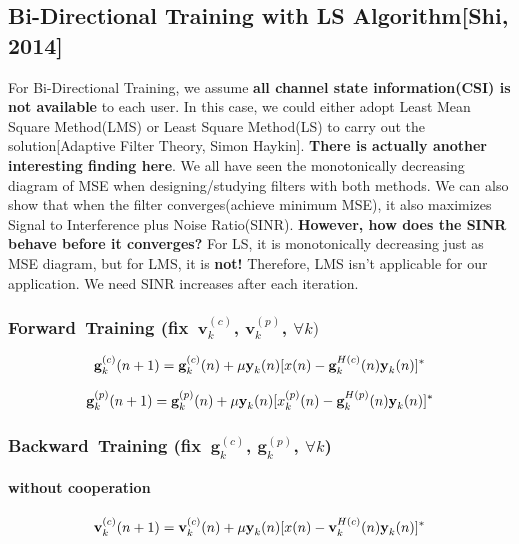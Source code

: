 \documentclass[11pt, oneside]{article}   	%
\begin{document}
\subsection{Bi-Directional Training with LS Algorithm[Shi, 2014]}
For Bi-Directional Training, we assume \textbf{all channel state information(CSI) is not available} to each user. In this case, we could either adopt Least Mean Square Method(LMS) or Least Square Method(LS) to carry out the solution[Adaptive Filter Theory, Simon Haykin]. \textbf{There is actually another interesting finding here}. We all have seen the monotonically decreasing diagram of MSE when designing/studying filters with both methods. We can also show that when the filter converges(achieve minimum MSE), it also maximizes Signal to Interference plus Noise Ratio(SINR). \textbf{However, how does the SINR behave before it converges?} For LS, it is monotonically  decreasing just as MSE diagram, but for LMS, it is \textbf{not!} Therefore, LMS isn't applicable for our application. We need SINR increases after each iteration.


\subsubsection{Forward\ Training (fix\  $\textbf{v}^{(c)}_{k}$, $\textbf{v}^{(p)}_{k}$, $\forall k)$}


\begin{align*}
\textbf{g}^{(c)}_{k}(n+1)= \textbf{g}^{(c)}_{k}(n)+ \mu \textbf y_k(n) [x(n)- \textbf{g}^{H(c)}_{k}(n) \textbf y_k(n)]^*
\end{align*}

\begin{align*}
\textbf{g}^{(p)}_{k}(n+1)= \textbf{g}^{(p)}_{k}(n)+ \mu \textbf y_k(n) [x_k^{(p)}(n)- \textbf{g}^{H(p)}_{k}(n) \textbf y_k(n)]^*
\end{align*}


\subsubsection{Backward\ Training (fix\  $\textbf{g}^{(c)}_{k}$, $\textbf{g}^{(p)}_{k}$, $\forall k$)}
\paragraph{without cooperation}


\begin{align*}
\textbf{v}^{(c)}_{k}(n+1)= \textbf{v}^{(c)}_{k}(n)+ \mu \textbf y_k(n) [x(n)- \textbf{v}^{H(c)}_{k}(n) \textbf y_k(n)]^*
\end{align*}
\end{document}
